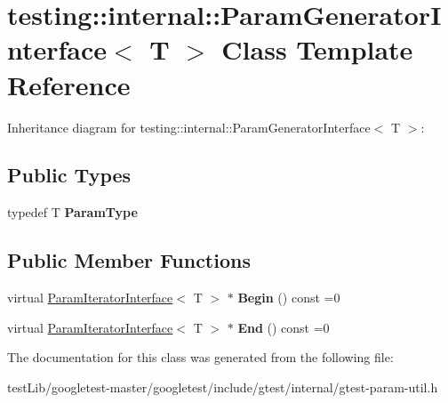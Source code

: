 \hypertarget{classtesting_1_1internal_1_1ParamGeneratorInterface}{}\section{testing\+:\+:internal\+:\+:Param\+Generator\+Interface$<$ T $>$ Class Template Reference}
\label{classtesting_1_1internal_1_1ParamGeneratorInterface}


Inheritance diagram for testing\+:\+:internal\+:\+:Param\+Generator\+Interface$<$ T $>$\+:
\subsection*{Public Types}
\begin{DoxyCompactItemize}
\item 
\mbox{\label{classtesting_1_1internal_1_1ParamGeneratorInterface_ab33d2ea424c50beaf503cb125b3cd003}} 
typedef T {\bfseries Param\+Type}
\end{DoxyCompactItemize}
\subsection*{Public Member Functions}
\begin{DoxyCompactItemize}
\item 
\mbox{\label{classtesting_1_1internal_1_1ParamGeneratorInterface_ae1de83b16fe9a53c67778a026c6a9569}} 
virtual \hyperlink{classtesting_1_1internal_1_1ParamIteratorInterface}{Param\+Iterator\+Interface}$<$ T $>$ $\ast$ {\bfseries Begin} () const =0
\item 
\mbox{\label{classtesting_1_1internal_1_1ParamGeneratorInterface_afa7211b74990e11d3fc7ad4e7113da4f}} 
virtual \hyperlink{classtesting_1_1internal_1_1ParamIteratorInterface}{Param\+Iterator\+Interface}$<$ T $>$ $\ast$ {\bfseries End} () const =0
\end{DoxyCompactItemize}


The documentation for this class was generated from the following file\+:\begin{DoxyCompactItemize}
\item 
test\+Lib/googletest-\/master/googletest/include/gtest/internal/gtest-\/param-\/util.\+h\end{DoxyCompactItemize}
